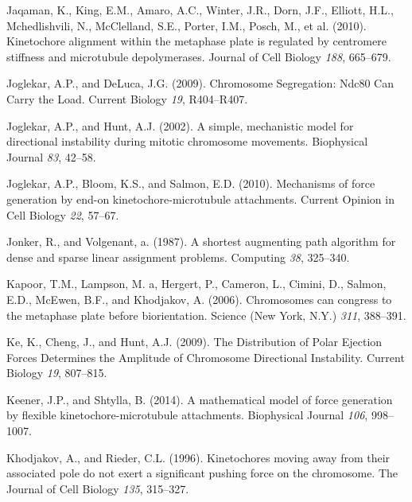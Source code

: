 \documentclass[12pt,a4paper,twoside,openright]{book}
\begin{document}
Jaqaman, K., King, E.M., Amaro, A.C., Winter, J.R., Dorn, J.F., Elliott,
H.L., Mchedlishvili, N., McClelland, S.E., Porter, I.M., Posch, M., et
al. (2010). Kinetochore alignment within the metaphase plate is
regulated by centromere stiffness and microtubule depolymerases. Journal
of Cell Biology \emph{188}, 665--679.

Joglekar, A.P., and DeLuca, J.G. (2009). Chromosome Segregation: Ndc80
Can Carry the Load. Current Biology \emph{19}, R404--R407.

Joglekar, A.P., and Hunt, A.J. (2002). A simple, mechanistic model for
directional instability during mitotic chromosome movements. Biophysical
Journal \emph{83}, 42--58.

Joglekar, A.P., Bloom, K.S., and Salmon, E.D. (2010). Mechanisms of
force generation by end-on kinetochore-microtubule attachments. Current
Opinion in Cell Biology \emph{22}, 57--67.

Jonker, R., and Volgenant, a. (1987). A shortest augmenting path
algorithm for dense and sparse linear assignment problems. Computing
\emph{38}, 325--340.

Kapoor, T.M., Lampson, M. a, Hergert, P., Cameron, L., Cimini, D.,
Salmon, E.D., McEwen, B.F., and Khodjakov, A. (2006). Chromosomes can
congress to the metaphase plate before biorientation. Science (New York,
N.Y.) \emph{311}, 388--391.

Ke, K., Cheng, J., and Hunt, A.J. (2009). The Distribution of Polar
Ejection Forces Determines the Amplitude of Chromosome Directional
Instability. Current Biology \emph{19}, 807--815.

Keener, J.P., and Shtylla, B. (2014). A mathematical model of force
generation by flexible kinetochore-microtubule attachments. Biophysical
Journal \emph{106}, 998--1007.

Khodjakov, A., and Rieder, C.L. (1996). Kinetochores moving away from
their associated pole do not exert a significant pushing force on the
chromosome. The Journal of Cell Biology \emph{135}, 315--327.
\end{document}
